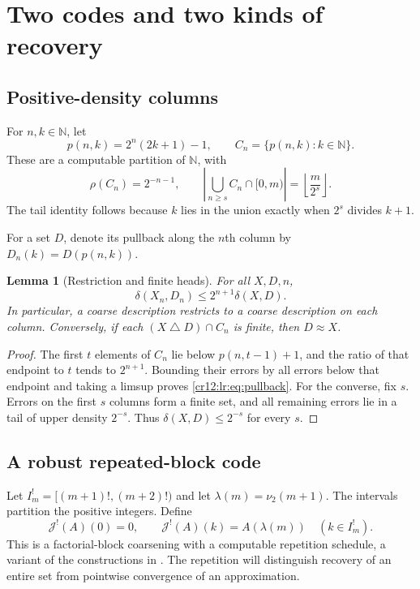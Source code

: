 \documentclass[11pt,letterpaper]{article}
\theoremstyle{plain}
\newtheorem{lemma}[theorem]{Lemma}
\theoremstyle{definition}
\theoremstyle{remark}
\numberwithin{equation}{section}
\newcommand{\N}{\mathbb N}
\newcommand{\sd}{\mathbin{\triangle}}
\newcommand{\Jfac}{\mathcal J^{!}}       %
\begin{document}
\section{Two codes and two kinds of recovery}\label{cr12:lr:sec:codes}
\subsection{Positive-density columns}
For $n,k\in\N$, let
\begin{equation}\label{cr12:lr:eq:columns}
 p(n,k)=2^n(2k+1)-1,\qquad C_n=\{p(n,k):k\in\N\}.
\end{equation}
These are a computable partition of $\N$, with
\begin{equation}\label{cr12:lr:eq:tailcount}
 \rho(C_n)=2^{-n-1},\qquad
 \left|\bigcup_{n\geq s}C_n\cap[0,m)\right|=\left\lfloor\frac m{2^s}\right\rfloor.
\end{equation}
The tail identity follows because $k$ lies in the union exactly when $2^s$ divides
$k+1$.

For a set $D$, denote its pullback along the $n$th column by $D_n(k)=D(p(n,k))$.
\begin{lemma}[Restriction and finite heads]\label{cr12:lr:lem:columns}
For all $X,D,n$,
\begin{equation}\label{cr12:lr:eq:pullback}
 \delta(X_n,D_n)\leq2^{n+1}\delta(X,D).
\end{equation}
In particular, a coarse description restricts to a coarse description on each column.
Conversely, if each $(X\sd D)\cap C_n$ is finite, then $D\approx X$.
\end{lemma}
\begin{proof}
The first $t$ elements of $C_n$ lie below $p(n,t-1)+1$, and the ratio of that endpoint
to $t$ tends to $2^{n+1}$. Bounding their errors by all errors below that endpoint and
taking a limsup proves \eqref{cr12:lr:eq:pullback}. For the converse, fix $s$. Errors
on the first $s$ columns form a finite set, and all remaining errors lie in a tail of
upper density $2^{-s}$. Thus $\delta(X,D)\leq2^{-s}$ for every $s$.
\end{proof}

\subsection{A robust repeated-block code}
Let $I^!_m=[(m+1)!,(m+2)!)$ and let $\lambda(m)=\nu_2(m+1)$. The intervals partition the
positive integers. Define
\begin{equation}\label{cr12:lr:eq:blockcode}
 \Jfac(A)(0)=0,\qquad \Jfac(A)(k)=A(\lambda(m))\quad(k\in I^!_m).
\end{equation}
This is a factorial-block coarsening with a computable repetition schedule, a variant
of the constructions in \cite[Section~2]{HJKS}. The repetition will distinguish
recovery of an entire set from pointwise convergence of an approximation.
\end{document}
